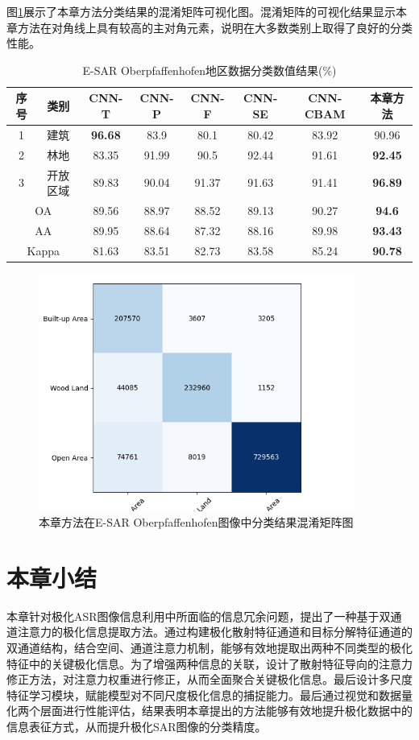 图\ref{fig:ober_conf_matrix}展示了本章方法分类结果的混淆矩阵可视化图。混淆矩阵的可视化结果显示本章方法在对角线上具有较高的主对角元素，说明在大多数类别上取得了良好的分类性能。

\begin{table}[ht!]
    \caption{E-SAR Oberpfaffenhofen地区数据分类数值结果(\%)}
    \label{tab:ober_res}
    \begin{tabular}{cccccccc}
        \toprule[1.5bp]
        序号                        & 类别    & CNN-T          & CNN-P & CNN-F & CNN-SE & CNN-CBAM       & 本章方法           \\
        \midrule[0.75bp]
        1                         & 建筑    & \textbf{96.68} & 83.9  & 80.1  & 80.42  & 83.92          & 90.96          \\
        2                         & 林地    & 83.35          & 91.99 & 90.5  & 92.44  & 91.61          & \textbf{92.45} \\
        3                         & 开放区域  & 89.83          & 90.04 & 91.37 & 91.63  & 91.41          & \textbf{96.89} \\
        \midrule[0.75bp]
        \multicolumn{2}{c}{OA}    & 89.56 & 88.97          & 88.52 & 89.13 & 90.27  & \textbf{94.6}                   \\
        \multicolumn{2}{c}{AA}    & 89.95 & 88.64          & 87.32 & 88.16 & 89.98  & \textbf{93.43}                  \\
        \multicolumn{2}{c}{Kappa} & 81.63 & 83.51          & 82.73 & 83.58 & 85.24  & \textbf{90.78}                  \\
        \bottomrule[1.5bp]
    \end{tabular}
\end{table}

\begin{figure}[ht!]
    \centering
    \includegraphics[width=10.4cm]{pic/chapter3/ober/conf-matrix.png}
    \caption{本章方法在E-SAR Oberpfaffenhofen图像中分类结果混淆矩阵图}
    \label{fig:ober_conf_matrix}
\end{figure}



\section{本章小结}
本章针对极化ASR图像信息利用中所面临的信息冗余问题，提出了一种基于双通道注意力的极化信息提取方法。通过构建极化散射特征通道和目标分解特征通道的双通道结构，结合空间、通道注意力机制，能够有效地提取出两种不同类型的极化特征中的关键极化信息。为了增强两种信息的关联，设计了散射特征导向的注意力修正方法，对注意力权重进行修正，从而全面聚合关键极化信息。最后设计多尺度特征学习模块，赋能模型对不同尺度极化信息的捕捉能力。最后通过视觉和数据量化两个层面进行性能评估，结果表明本章提出的方法能够有效地提升极化数据中的信息表征方式，从而提升极化SAR图像的分类精度。